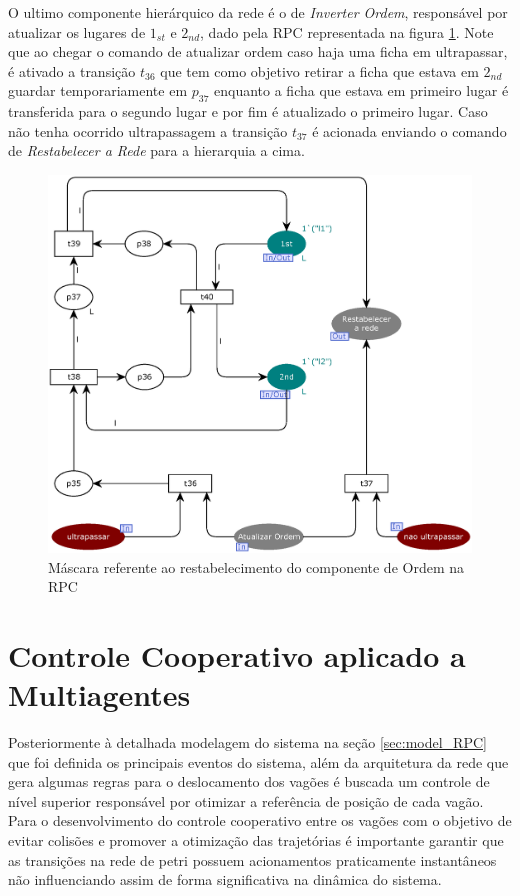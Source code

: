 O ultimo componente hierárquico da rede é o de \textit{Inverter Ordem}, responsável por atualizar os lugares de $1_{st}$ e $2_{nd}$, dado pela RPC representada na figura \ref{fig:inverter_ordem}. Note que ao chegar o comando de atualizar ordem caso haja uma ficha em ultrapassar, é ativado a transição $t_{36}$ que tem como objetivo retirar a ficha que estava em $2_{nd}$ guardar temporariamente em $p_{37}$ enquanto a ficha que estava em primeiro lugar é transferida para o segundo lugar e por fim é atualizado o primeiro lugar.
Caso não tenha ocorrido ultrapassagem a transição $t_{37}$ é acionada enviando o comando de \textit{Restabelecer a Rede} para a hierarquia a cima.

\begin{figure}[ht]
    \centering
    \caption{Máscara referente ao restabelecimento do componente de Ordem na RPC}
    \label{fig:inverter_ordem}
    \includegraphics[width=1\linewidth]{figures/Simulation/Modelagem/inverter_ordem.eps}
\end{figure}

\section{Controle Cooperativo aplicado a Multiagentes}
Posteriormente à detalhada modelagem do sistema na seção \ref{sec:model_RPC} que foi definida os principais eventos do sistema, além da arquitetura da rede que gera algumas regras para o deslocamento dos vagões é buscada um controle de nível superior responsável por otimizar a referência de posição de cada vagão. Para o desenvolvimento do controle cooperativo entre os vagões com o objetivo de evitar colisões e promover a otimização das trajetórias é importante garantir que as transições na rede de petri possuem acionamentos praticamente instantâneos não influenciando assim de forma significativa na dinâmica do sistema.



